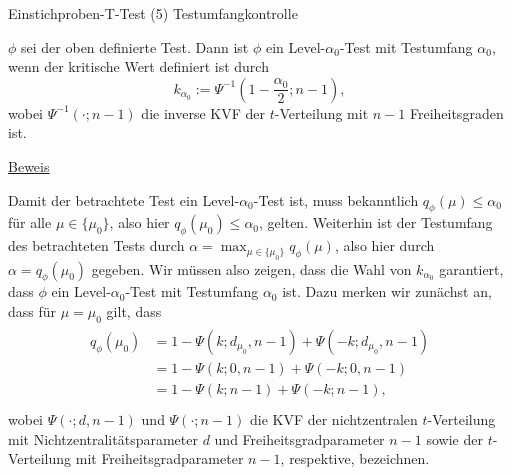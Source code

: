 \documentclass[
  8pt,
  ignorenonframetext,
]{beamer}
\begin{document}
\begin{frame}{Einstichproben-T-Test \textbar{} (5) Testumfangkontrolle}
\protect\hypertarget{einstichproben-t-test-5-testumfangkontrolle}{}
\small
\begin{theorem}[Testumfangkontrolle]
\justifying
\normalfont
$\phi$ sei der oben definierte Test. Dann ist $\phi$ ein
Level-$\alpha_0$-Test mit Testumfang $\alpha_0$, wenn der kritische Wert
definiert ist durch
\begin{equation}
k_{\alpha_0} := \Psi^{-1}\left(1 - \frac{\alpha_0}{2}; n-1 \right),
\end{equation}
wobei $\Psi^{-1}(\cdot; n-1)$ die inverse KVF der $t$-Verteilung mit $n-1$
Freiheitsgraden ist.
\end{theorem}

\footnotesize

\underline{Beweis}

Damit der betrachtete Test ein Level-\(\alpha_0\)-Test ist, muss
bekanntlich \(q_\phi(\mu) \le \alpha_0\) für alle \(\mu \in \{\mu_0\}\),
also hier \(q_\phi(\mu_0) \le \alpha_0\), gelten. Weiterhin ist der
Testumfang des betrachteten Tests durch
\(\alpha = \max_{\mu \in \{\mu_0\}} q_\phi(\mu)\), also hier durch
\(\alpha = q_\phi(\mu_0)\) gegeben. Wir müssen also zeigen, dass die
Wahl von \(k_{\alpha_0}\) garantiert, dass \(\phi\) ein
Level-\(\alpha_0\)-Test mit Testumfang \(\alpha_0\) ist. Dazu merken wir
zunächst an, dass für \(\mu = \mu_0\) gilt, dass \begin{align}
\begin{split}
q_\phi(\mu_0)
& =  1 - \Psi(k;d_{\mu_0},n-1) + \Psi(-k;d_{\mu_0},n-1)                          \\
& =  1 - \Psi(k;0,n-1) + \Psi(-k;0,n-1)                                          \\
& =  1 - \Psi(k;n-1) + \Psi(-k;n-1),                                             \\
\end{split}
\end{align} wobei \(\Psi(\cdot;d,n-1)\) und \(\Psi(\cdot;n-1)\) die KVF
der nichtzentralen \(t\)-Verteilung mit Nichtzentralitätsparameter \(d\)
und Freiheitsgradparameter \(n-1\) sowie der \(t\)-Verteilung mit
Freiheitsgradparameter \(n-1\), respektive, bezeichnen.
\end{frame}
\end{document}
